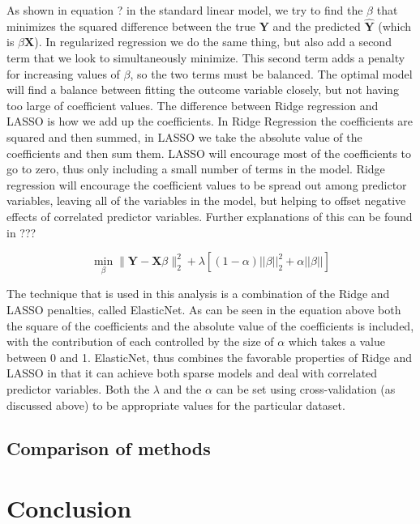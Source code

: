 \documentclass{article}
\newcommand{\bX}{\mathbf{X}}
\newcommand{\bY}{\mathbf{Y}}
\begin{document}
As shown in equation ? in the standard linear model, we try to find the $\beta$ that minimizes the squared difference between 
the true $\bY$ and the predicted $\hat{\bY}$ (which is $\beta\bX$). In regularized regression we do the same thing, but also 
add a second term that we look to simultaneously minimize. This second term adds a penalty for increasing values of $
\beta$, so the two terms must be balanced. The optimal model will find a balance between fitting the outcome variable 
closely, but not having too large of coefficient values. The difference between Ridge regression and LASSO is how we add up 
the coefficients. In Ridge Regression the coefficients are squared and then summed, in LASSO we take the absolute value of 
the coefficients and then sum them. LASSO will encourage most of the coefficients to go to zero, thus only including a small 
number of terms in the model. Ridge regression will encourage the coefficient values to be spread out among predictor 
variables, leaving all of the variables in the model, but helping to offset negative effects of correlated predictor variables. Further explanations of this can be found in ???

\[\min_{\beta}  \|\bY - \bX\beta\|_{2}^{2} + \lambda[(1 - \alpha)||\beta||_2^2 + \alpha||\beta||] \tag{ElasticNet}\]

The technique that is used in this analysis is a combination of the Ridge and LASSO penalties, called ElasticNet. As can be seen in the equation above both the square of the coefficients and the absolute value of the coefficients is included, with the contribution of each controlled by the size of $\alpha$ which takes a value between 0 and 1. ElasticNet, thus combines the favorable properties of Ridge and LASSO in that it can achieve both sparse models and deal with correlated predictor variables. Both the $\lambda$ and the $\alpha$ can be set using cross-validation (as discussed above) to be appropriate values for the particular dataset. 

\subsection{Comparison of methods}


\section{Conclusion}


\medskip

\small
\end{document}
